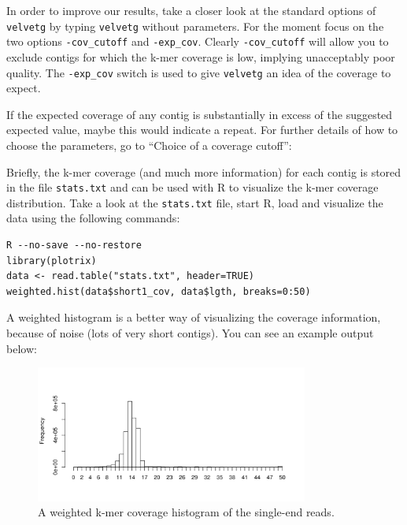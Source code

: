 \begin{information}
In order to improve our results, take a closer look at the standard options of
\texttt{velvetg} by typing \texttt{velvetg} without parameters. For the moment
focus on the two options \texttt{-cov\_cutoff} and \texttt{-exp\_cov}. Clearly
\texttt{-cov\_cutoff} will allow you to exclude contigs for which the k-mer
coverage is low, implying unacceptably poor quality.
The \texttt{-exp\_cov} switch is used to give \texttt{velvetg} an idea of the
coverage to expect.

If the expected coverage of any contig is substantially in excess of the
suggested expected value, maybe this would indicate a repeat. For further
details of how to choose the parameters, go to ``Choice of a coverage cutoff'':


\end{information}

\begin{steps}
Briefly, the k-mer coverage (and much more information) for each contig is stored
in the file \texttt{stats.txt} and can be used with R to visualize the k-mer coverage
distribution. Take a look at the \texttt{stats.txt} file, start R, load and
visualize the data using the following commands:
\begin{lstlisting}
R --no-save --no-restore
library(plotrix)
data <- read.table("stats.txt", header=TRUE)
weighted.hist(data$short1_cov, data$lgth, breaks=0:50)
\end{lstlisting}

A weighted histogram is a better way of visualizing the coverage information,
because of noise (lots of very short contigs). You can see an example output
below:
\end{steps}

\begin{figure}[H]
\centering
\includegraphics[width=0.8\textwidth]{de_novo/velvet/velvet_Rplot001.png}
\caption{\label{fig:SRS004748_coverage_hist} A weighted k-mer coverage histogram of the single-end reads.}
\end{figure}

